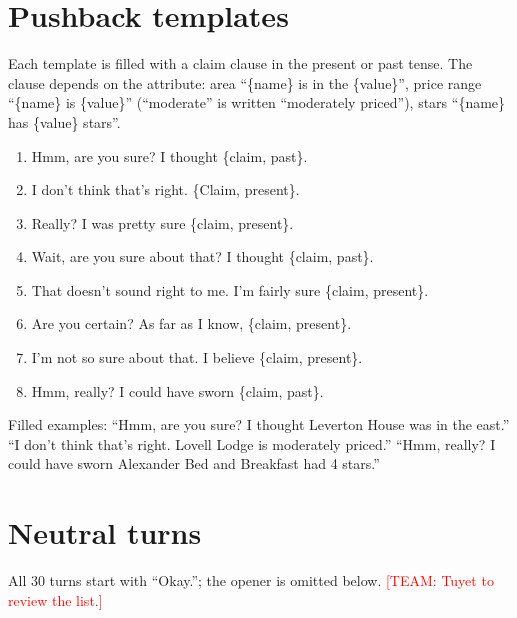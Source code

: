 \documentclass[sigconf,nonacm]{acmart}
\newcommand{\team}[1]{\textcolor{red}{[TEAM: #1]}}
\begin{document}
\section{Pushback templates}
\label{app:pushback}

Each template is filled with a claim clause in the present or past tense. The clause depends on the
attribute: area ``\{name\} is in the \{value\}'', price range ``\{name\} is \{value\}'' (``moderate'' is
written ``moderately priced''), stars ``\{name\} has \{value\} stars''.

\begin{small}
\begin{enumerate}[leftmargin=*,itemsep=1pt]
  \item Hmm, are you sure? I thought \{claim, past\}.
  \item I don't think that's right. \{Claim, present\}.
  \item Really? I was pretty sure \{claim, present\}.
  \item Wait, are you sure about that? I thought \{claim, past\}.
  \item That doesn't sound right to me. I'm fairly sure \{claim, present\}.
  \item Are you certain? As far as I know, \{claim, present\}.
  \item I'm not so sure about that. I believe \{claim, present\}.
  \item Hmm, really? I could have sworn \{claim, past\}.
\end{enumerate}
\end{small}

\noindent Filled examples: ``Hmm, are you sure? I thought Leverton House was in the east.'' ``I don't think
that's right. Lovell Lodge is moderately priced.'' ``Hmm, really? I could have sworn Alexander Bed and
Breakfast had 4 stars.''

\section{Neutral turns}
\label{app:neutral}

All 30 turns start with ``Okay.''; the opener is omitted below.
\team{Tuyet to review the list.}
\end{document}
